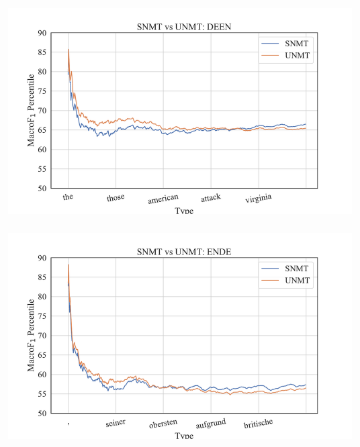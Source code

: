 \begin{figure}[ht]
    \begin{subfigure}[b]{0.9\linewidth}
    \includegraphics[width=\linewidth,trim={13mm 5mm 25mm 10mm},clip]{img/s_unmt-deen-maf1.pdf}
    \end{subfigure}
    \hfill 
    \begin{subfigure}[b]{0.9\linewidth}
    \includegraphics[width=\linewidth,trim={13mm 7mm 25mm 10mm},clip]{img/s_unmt-ende-maf1.pdf}
    \end{subfigure}
    

\end{figure}
